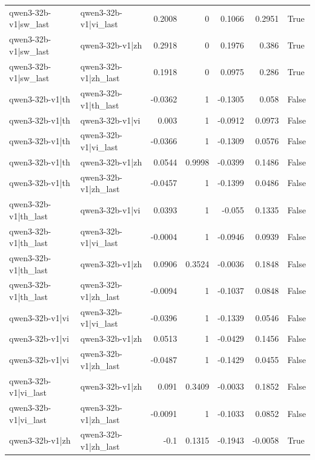 \begin{table}
\begin{tabular}{l l r r r r l}
qwen3-32b-v1|sw_last & qwen3-32b-v1|vi_last & 0.2008 & 0 & 0.1066 & 0.2951 & True \\
qwen3-32b-v1|sw_last & qwen3-32b-v1|zh & 0.2918 & 0 & 0.1976 & 0.386 & True \\
qwen3-32b-v1|sw_last & qwen3-32b-v1|zh_last & 0.1918 & 0 & 0.0975 & 0.286 & True \\
qwen3-32b-v1|th & qwen3-32b-v1|th_last & -0.0362 & 1 & -0.1305 & 0.058 & False \\
qwen3-32b-v1|th & qwen3-32b-v1|vi & 0.003 & 1 & -0.0912 & 0.0973 & False \\
qwen3-32b-v1|th & qwen3-32b-v1|vi_last & -0.0366 & 1 & -0.1309 & 0.0576 & False \\
qwen3-32b-v1|th & qwen3-32b-v1|zh & 0.0544 & 0.9998 & -0.0399 & 0.1486 & False \\
qwen3-32b-v1|th & qwen3-32b-v1|zh_last & -0.0457 & 1 & -0.1399 & 0.0486 & False \\
qwen3-32b-v1|th_last & qwen3-32b-v1|vi & 0.0393 & 1 & -0.055 & 0.1335 & False \\
qwen3-32b-v1|th_last & qwen3-32b-v1|vi_last & -0.0004 & 1 & -0.0946 & 0.0939 & False \\
qwen3-32b-v1|th_last & qwen3-32b-v1|zh & 0.0906 & 0.3524 & -0.0036 & 0.1848 & False \\
qwen3-32b-v1|th_last & qwen3-32b-v1|zh_last & -0.0094 & 1 & -0.1037 & 0.0848 & False \\
qwen3-32b-v1|vi & qwen3-32b-v1|vi_last & -0.0396 & 1 & -0.1339 & 0.0546 & False \\
qwen3-32b-v1|vi & qwen3-32b-v1|zh & 0.0513 & 1 & -0.0429 & 0.1456 & False \\
qwen3-32b-v1|vi & qwen3-32b-v1|zh_last & -0.0487 & 1 & -0.1429 & 0.0455 & False \\
qwen3-32b-v1|vi_last & qwen3-32b-v1|zh & 0.091 & 0.3409 & -0.0033 & 0.1852 & False \\
qwen3-32b-v1|vi_last & qwen3-32b-v1|zh_last & -0.0091 & 1 & -0.1033 & 0.0852 & False \\
qwen3-32b-v1|zh & qwen3-32b-v1|zh_last & -0.1 & 0.1315 & -0.1943 & -0.0058 & True \\
\bottomrule
\end{tabular}
\end{table}
